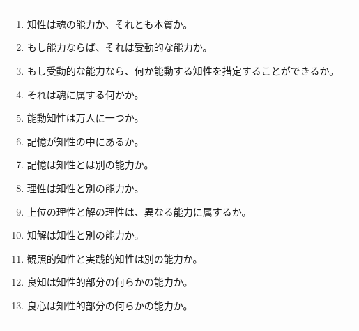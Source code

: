 \documentclass[paper=a4paper,fontsize=10pt,jafontsize=9pt,titlepage]{jlreq}
\begin{document}
\begin{longtable}{p{21em}p{21em}}
\begin{enumerate}
 \item 知性は魂の能力か、それとも本質か。
 \item もし能力ならば、それは受動的な能力か。
 \item もし受動的な能力なら、何か能動する知性を措定することができるか。
 \item それは魂に属する何かか。
 \item 能動知性は万人に一つか。
 \item 記憶が知性の中にあるか。
 \item 記憶は知性とは別の能力か。
 \item 理性は知性と別の能力か。
 \item 上位の理性と解の理性は、異なる能力に属するか。
 \item 知解は知性と別の能力か。
 \item 観照的知性と実践的知性は別の能力か。
 \item 良知は知性的部分の何らかの能力か。
 \item 良心は知性的部分の何らかの能力か。
\end{enumerate}
\end{longtable}

\newpage
\end{document}
